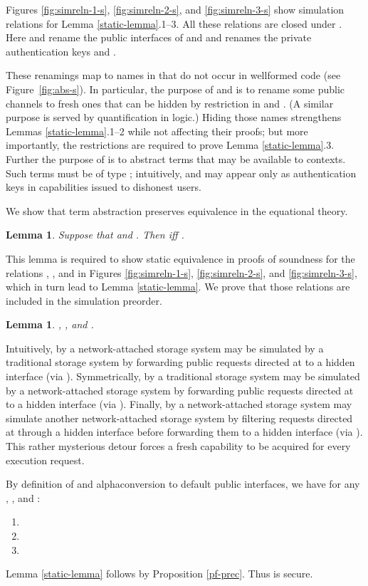 \documentclass[10pt]{article}
\newtheorem{lemma}[theorem]{Lemma}
\begin{document}
Figures \ref{fig:simreln-1-s}, \ref{fig:simreln-2-s}, and \ref{fig:simreln-3-s} show simulation relations for Lemma \ref{static-lemma}.1--3. All these relations are closed under . Here  and  rename the public interfaces of  and  and  renames the private authentication keys  and . 

These renamings map to names in  that do not occur in wellformed code (see Figure~\ref{fig:abs-s}). 
In particular, the purpose of  and  is to rename some public channels to fresh ones that can be hidden by restriction in  and . (A similar purpose is served by quantification in logic.) Hiding those names strengthens Lemmas \ref{static-lemma}.1--2 while not affecting their proofs; but more importantly, the restrictions are required to prove Lemma \ref{static-lemma}.3. Further the purpose of  is to abstract terms that may be available to contexts. Such terms must be of type ; intuitively,  and  may appear only as authentication keys in capabilities issued to dishonest users.

We show that term abstraction preserves equivalence in the equational theory. 
\begin{lemma} Suppose that  and . Then  iff .
\end{lemma}
This lemma is required to show static equivalence in proofs of soundness for the relations , , and  in Figures \ref{fig:simreln-1-s}, \ref{fig:simreln-2-s}, and \ref{fig:simreln-3-s}, which in turn lead to Lemma \ref{static-lemma}. We prove that those relations are included in the simulation preorder.
\begin{lemma} , , and .
\end{lemma}
Intuitively, by  a network-attached storage system may be simulated by a traditional storage system by forwarding public requests directed at  to a hidden  interface (via ). Symmetrically, by  a traditional storage system may be simulated by a network-attached storage system by forwarding public requests directed at  to a hidden  interface (via ). 
Finally, by  a network-attached storage system may simulate another network-attached storage system by filtering requests directed at  through a hidden  interface before forwarding them to a hidden  interface (via ). This rather mysterious detour forces a fresh capability to be acquired for every execution request.

By definition of  and alphaconversion to default public interfaces, we have for any , , and :
\begin{enumerate}
\item 
\item 
\item 
\par 
\end{enumerate}
Lemma \ref{static-lemma} follows by Proposition \ref{pf-prec}. Thus  is secure.
\end{document}
